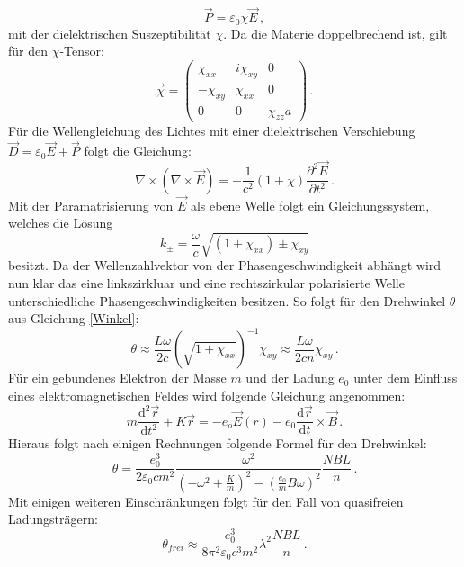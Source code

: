 \begin{equation*}
	\vec{P}=\varepsilon_0 \chi \vec{E} \, \mathrm{,}
\end{equation*}
mit der dielektrischen Suszeptibilität $\chi$. Da die Materie doppelbrechend ist, gilt für den $\chi$-Tensor:
\begin{equation*}
	\vec{\chi} =
	\begin{pmatrix}
		\chi_{xx} & i\chi_{xy} & 0 \\
		-\chi_{xy} & \chi_{xx} & 0 \\
		0 & 0 & \chi_{zz}a
	\end{pmatrix} \, \mathrm{.}
\end{equation*}
Für die Wellengleichung des Lichtes mit einer dielektrischen Verschiebung $\vec{D}=\varepsilon_0 \vec{E} + \vec{P}$ folgt die Gleichung:
\begin{equation*}
	\nabla \times (\nabla \times \vec{E}) = -\frac{1}{c^2}(1+\chi)\frac{\partial^2\vec{E}}{\partial t^2} \, \mathrm{.}
\end{equation*}
Mit der Paramatrisierung von $\vec{E}$ als ebene Welle folgt ein Gleichungssystem, welches die
Lösung
\begin{equation*}
	k_{\pm} = \frac{\omega}{c}\sqrt{(1+\chi_{xx}) \pm \chi_{xy}}
\end{equation*}
besitzt. Da der Wellenzahlvektor von der Phasengeschwindigkeit abhängt wird nun klar das eine linkszirkluar und eine rechtszirkular polarisierte Welle unterschiedliche Phasengeschwindigkeiten besitzen. So folgt für den Drehwinkel $\theta$ aus Gleichung \eqref{Winkel}:
\begin{equation*}
	\theta \approx \frac{L\omega}{2c}(\sqrt{1+\chi_{xx}})^{-1}\chi_{xy} \approx \frac{L\omega}{2cn}\chi_{xy} \, \mathrm{.}
\end{equation*}
Für ein gebundenes Elektron der Masse $m$ und der Ladung $e_0$ unter dem Einfluss eines elektromagnetischen Feldes wird folgende Gleichung angenommen:
\begin{equation*}
	m\frac{\mathrm{d}^2\vec{r}}{\mathrm{d}t^2}+K\vec{r} = - e_o \vec{E}(r) -e_0 \frac{\mathrm{d}\vec{r}}{\mathrm{d}t}\times \vec{B} \, \mathrm{.}
\end{equation*}
Hieraus folgt nach einigen Rechnungen folgende Formel für den Drehwinkel:
\begin{equation*}
	\theta = \frac{e_0^3}{2 \varepsilon_0 c m^2} \frac{\omega^2}{\left(-\omega^2+\frac{K}{m}
	\right)^2-\left(\frac{e_0}{m}B\omega\right)^2}\frac{NBL}{n} \, \mathrm{.}
\end{equation*}
Mit einigen weiteren Einschränkungen folgt für den Fall von quasifreien Ladungsträgern:
\begin{equation}\label{eqn:Masse}
	\theta_{frei}\approx\frac{e_0^3}{8 \pi^2 \varepsilon_0 c^3 m^2}\lambda^2\frac{NBL}{n} \, \mathrm{.}
\end{equation}
